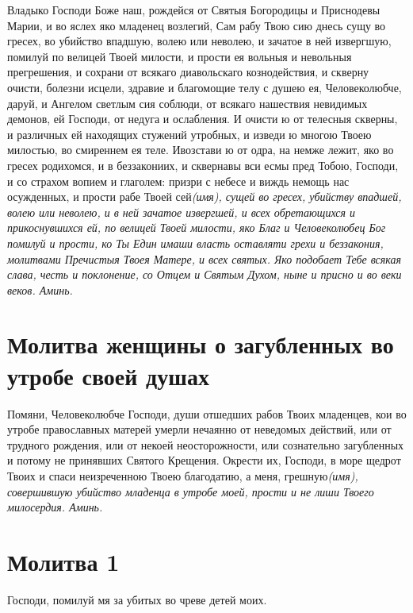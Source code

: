 Владыко Господи Боже наш, рождейся от Святыя Богородицы и Приснодевы Марии, и во яслех яко младенец возлегий, Сам рабу Твою сию днесь сущу во гресех, во убийство впадшую, волею или неволею, и зачатое в ней извергшую, помилуй по велицей Твоей милости, и прости ея вольныя и невольныя прегрешения, и сохрани от всякаго диавольскаго кознодействия, и скверну очисти, болезни исцели, здравие и благомощие телу с душею ея, Человеколюбче, даруй, и Ангелом светлым сия соблюди, от всякаго нашествия невидимых демонов, ей Господи, от недуга и ослабления. И очисти ю от телесныя скверны, и различных ей находящих стужений утробных, и изведи ю многою Твоею милостью, во смиреннем ея теле. Ивозстави ю от одра, на немже лежит, яко во гресех родихомся, и в беззакониих, и сквернавы вси есмы пред Тобою, Господи, и со страхом вопием и глаголем: призри с небесе и виждь немощь нас осужденных, и прости рабе Твоей сей\itshape  (имя\normalfont{})\itshape ,\normalfont{} сущей во гресех, убийству впадшей, волею или неволею, и в ней зачатое извергшей, и всех обретающихся и прикоснувшихся ей, по велицей Твоей милости, яко Благ и Человеколюбец Бог помилуй и прости, ко Ты Един имаши власть оставляти грехи и беззакония, молитвами Пречистыя Твоея Матере, и всех святых. Яко подобает Тебе всякая слава, честь и поклонение, со Отцем и Святым Духом, ныне и присно и во веки веков. Аминь. 


\section{Молитва женщины о загубленных во утробе своей душах}
 


Помяни, Человеколюбче Господи, души отшедших рабов Твоих младенцев, кои во утробе православных матерей умерли нечаянно от неведомых действий, или от трудного рождения, или от некоей неосторожности, или сознательно загубленных и потому не принявших Святого Крещения. Окрести их, Господи, в море щедрот Твоих и спаси неизреченною Твоею благодатию, а меня, грешную\itshape  (имя\normalfont{}), совершившую убийство младенца в утробе моей, прости и не лиши Твоего милосердия. Аминь.


\section{Молитва 1}
 
Господи, помилуй мя за убитых во чреве детей моих.

